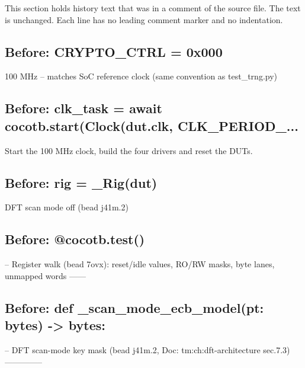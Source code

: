 This section holds history text that was in a comment of the source file. The text is unchanged. Each line has no leading comment marker and no indentation.

\begin{record}

\subsection*{Before: CRYPTO\_CTRL = 0x000}

\begin{textblock}
100 MHz -- matches SoC reference clock (same convention as test_trng.py)
\end{textblock}

\subsection*{Before: clk\_task = await cocotb.start(Clock(dut.clk, CLK\_PERIOD\_...}

\begin{textblock}
Start the 100 MHz clock, build the four drivers and reset the DUTs.
\end{textblock}

\subsection*{Before: rig = \_Rig(dut)}

\begin{textblock}
DFT scan mode off (bead j41m.2)
\end{textblock}

\subsection*{Before: @cocotb.test()}

\begin{textblock}
-- Register walk (bead 7ovx): reset/idle values, RO/RW masks, byte lanes, unmapped words ------
\end{textblock}

\subsection*{Before: def \_scan\_mode\_ecb\_model(pt: bytes) -> bytes:}

\begin{textblock}
-- DFT scan-mode key mask (bead j41m.2, Doc: tm:ch:dft-architecture sec.7.3) --------------
\end{textblock}


\end{record}
